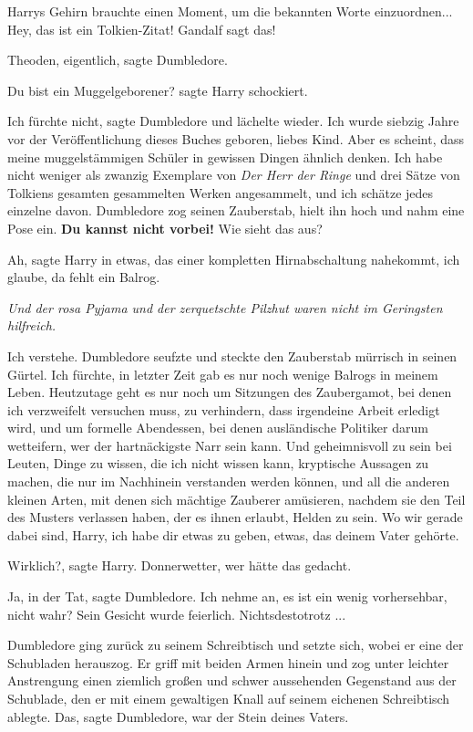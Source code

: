 Harrys Gehirn brauchte einen Moment, um die bekannten Worte einzuordnen... \glqq
Hey, das ist ein Tolkien-Zitat! Gandalf sagt das!\grqq{}

\glqq Theoden, eigentlich\grqq{}, sagte Dumbledore.

\glqq Du bist ein Muggelgeborener?\grqq{} sagte Harry schockiert.

\glqq Ich fürchte nicht\grqq{}, sagte Dumbledore und lächelte wieder. \glqq Ich
wurde siebzig Jahre vor der Veröffentlichung dieses Buches geboren, liebes Kind.
Aber es scheint, dass meine muggelstämmigen Schüler in gewissen Dingen ähnlich
denken. Ich habe nicht weniger als zwanzig Exemplare von \emph{Der Herr der
Ringe} und drei Sätze von Tolkiens gesamten gesammelten Werken angesammelt, und
ich schätze jedes einzelne davon.\grqq{} Dumbledore zog seinen Zauberstab, hielt
ihn hoch und nahm eine Pose ein. \glqq \textbf{Du kannst nicht vorbei!} Wie
sieht das aus?\grqq{}

\glqq Ah\grqq{}, sagte Harry in etwas, das einer kompletten Hirnabschaltung
nahekommt, \glqq ich glaube, da fehlt ein Balrog.\grqq{}

\emph{Und der rosa Pyjama und der zerquetschte Pilzhut waren nicht im Geringsten
hilfreich.}

\glqq Ich verstehe.\grqq{} Dumbledore seufzte und steckte den Zauberstab
mürrisch in seinen Gürtel. \glqq Ich fürchte, in letzter Zeit gab es nur noch
wenige Balrogs in meinem Leben. Heutzutage geht es nur noch um Sitzungen des
Zaubergamot, bei denen ich verzweifelt versuchen muss, zu verhindern, dass
irgendeine Arbeit erledigt wird, und um formelle Abendessen, bei denen
ausländische Politiker darum wetteifern, wer der hartnäckigste Narr sein kann.
Und geheimnisvoll zu sein bei Leuten, Dinge zu wissen, die ich nicht wissen
kann, kryptische Aussagen zu machen, die nur im Nachhinein verstanden werden
können, und all die anderen kleinen Arten, mit denen sich mächtige Zauberer
amüsieren, nachdem sie den Teil des Musters verlassen haben, der es ihnen
erlaubt, Helden zu sein. Wo wir gerade dabei sind, Harry, ich habe dir etwas zu
geben, etwas, das deinem Vater gehörte.\grqq{}

\glqq Wirklich?\grqq{}, sagte Harry. \glqq Donnerwetter, wer hätte das
gedacht.\grqq{}

\glqq Ja, in der Tat\grqq{}, sagte Dumbledore. \glqq Ich nehme an, es ist ein
wenig vorhersehbar, nicht wahr?\grqq{} Sein Gesicht wurde feierlich. \glqq
Nichtsdestotrotz ...\grqq{}

Dumbledore ging zurück zu seinem Schreibtisch und setzte sich, wobei er eine der
Schubladen herauszog. Er griff mit beiden Armen hinein und zog unter leichter
Anstrengung einen ziemlich großen und schwer aussehenden Gegenstand aus der
Schublade, den er mit einem gewaltigen Knall auf seinem eichenen Schreibtisch
ablegte. \glqq Das\grqq{}, sagte Dumbledore, \glqq war der Stein deines
Vaters.\grqq{}

